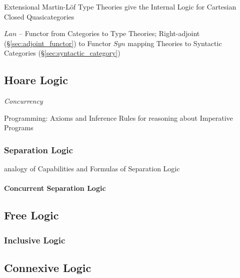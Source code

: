 Extensional Martin-L\"of Type Theories give the Internal Logic for
Cartesian Closed Quasicategories

$Lan$ -- Functor from Categories to Type Theories; Right-adjoint
(\S\ref{sec:adjoint_functor}) to Functor $Syn$ mapping Theories to
Syntactic Categories (\S\ref{sec:syntactic_category})



\subsection{Hoare Logic}\label{sec:hoare_logic}

\emph{Concurrency}

Programming: Axioms and Inference Rules for reasoning about Imperative
Programs



\subsubsection{Separation Logic}\label{sec:separation_logic}

analogy of Capabilities and Formulas of Separation Logic



\paragraph{Concurrent Separation Logic}
\label{sec:concurrent_separation}\hfill



\subsection{Free Logic}\label{sec:free_logic}

\subsubsection{Inclusive Logic}\label{sec:inclusive_logic}



\subsection{Connexive Logic}\label{sec:connexive_logic}

